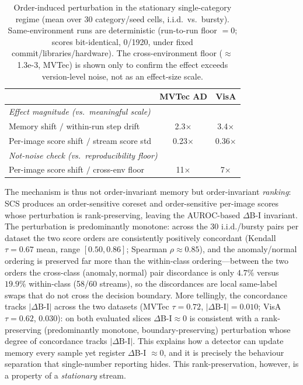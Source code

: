 \documentclass[runningheads]{llncs}
\begin{document}
\begin{table}[t]\centering\small
\caption{Order-induced perturbation in the stationary single-category regime
(mean over 30 category/seed cells, i.i.d.\ vs.\ bursty). Same-environment runs are
deterministic (run-to-run floor $=0$; scores bit-identical, 0/1920, under fixed
commit/libraries/hardware). The cross-environment floor ($\approx$1.3e-3, MVTec) is
shown only to confirm the effect exceeds version-level noise, not as an effect-size
scale.}
\label{tab:order-effect-size}
\begin{tabular}{lcc}
\toprule
 & MVTec AD & VisA \\
\midrule
\multicolumn{3}{l}{\emph{Effect magnitude (vs.\ meaningful scale)}}\\
Memory shift $/$ within-run step drift        & 2.3$\times$  & 3.4$\times$ \\
Per-image score shift $/$ stream score std    & 0.23$\times$ & 0.36$\times$ \\
\midrule
\multicolumn{3}{l}{\emph{Not-noise check (vs.\ reproducibility floor)}}\\
Per-image score shift $/$ cross-env floor     & 11$\times$   & 7$\times$ \\
\bottomrule
\end{tabular}
\end{table}

The mechanism is thus not order-invariant memory but order-invariant
\emph{ranking}: SCS produces an order-sensitive coreset and order-sensitive
per-image scores whose perturbation is rank-preserving, leaving the AUROC-based
$\Delta$B-I invariant. The perturbation is predominantly monotone: across the 30
i.i.d./bursty pairs per dataset the two score orders are consistently positively
concordant (Kendall $\tau = 0.67$ mean, range $[0.50, 0.86]$; Spearman
$\rho \approx 0.85$), and the anomaly/normal ordering is preserved far more than
the within-class ordering---between the two orders the cross-class
(anomaly,\,normal) pair discordance is only $4.7\%$ versus $19.9\%$ within-class
(58/60 streams), so the discordances are local same-label swaps that do not cross
the decision boundary. More tellingly, the concordance tracks $|\Delta\text{B-I}|$
across the two datasets (MVTec $\tau{=}0.72$, $|\Delta\text{B-I}|{=}0.010$; VisA
$\tau{=}0.62$, $0.030$): on both evaluated slices $\Delta$B-I$\approx$0 is
consistent with a rank-preserving (predominantly monotone, boundary-preserving)
perturbation whose degree of concordance tracks $|\Delta\text{B-I}|$. This explains how a detector can update memory every
sample yet register $\Delta$B-I $\approx 0$, and it is precisely the behaviour
separation that single-number reporting hides. This rank-preservation, however,
is a property of a \emph{stationary} stream.
\end{document}
